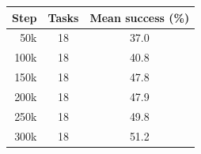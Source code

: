 \begin{tabular}{rcc}
\toprule
Step & Tasks & Mean success (\%) \\
\midrule
50k & 18 & 37.0 \\
100k & 18 & 40.8 \\
150k & 18 & 47.8 \\
200k & 18 & 47.9 \\
250k & 18 & 49.8 \\
300k & 18 & 51.2 \\
\bottomrule
\end{tabular}
